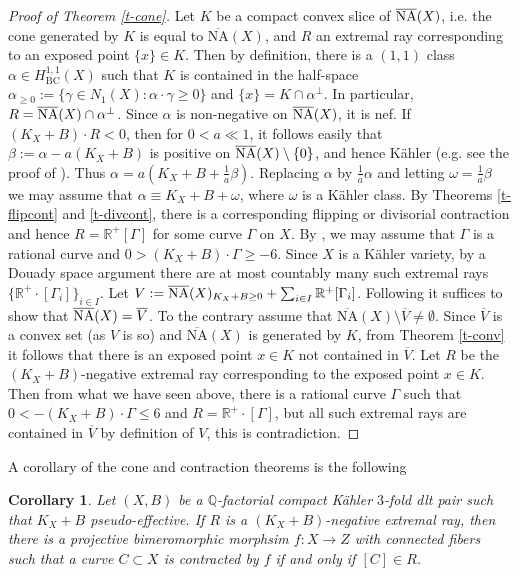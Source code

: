\documentclass[12pt]{amsart}
\theoremstyle{plain}
\newtheorem{corollary}[theorem]{Corollary}
\theoremstyle{remark}
\theoremstyle{definition}
\def\BC{\operatorname{BC}}
\def\NA{\overline{\operatorname{NA}}}
\newcommand{\<}{\leq}
\def\>{\geq}
\newcommand{\mbQ}{\mathbb{Q}}
\newcommand{\mbR}{\mathbb{R}}
\newcommand{\R}{{\mathbb{R}}}
\def\>{\geq}
\def\NA{\operatorname{\overline{NA}}}
\theoremstyle{definition}
\theoremstyle{definition}
\numberwithin{equation}{section}
\theoremstyle{remark}
\begin{document}
   \begin{proof}[Proof of Theorem \ref{t-cone}] Let $K$ be a compact convex slice of $\overline{\rm NA}(X)$, i.e. the cone generated by $K$ is equal to $\NA(X)$, and $R$ an extremal ray corresponding to an exposed point $\{x\}\in K$. Then by definition, there is a $(1,1)$ class $\alpha\in H^{1,1}_{\BC}(X)$ such that $K$ is contained in the half-space $\alpha_{\>0}:=\{\gamma\in N_1(X): \alpha\cdot\gamma\>0\}$ and $\{x\}=K\cap\alpha^\bot$. In particular, $R=\overline{\rm NA}(X)\cap \alpha ^\perp$. Since $\alpha$ is non-negative on $\overline{\rm NA}(X)$, it is nef. If $(K_X+B)\cdot R<0$, then for $0<a\ll 1$, it follows easily that $\beta :=\alpha -a(K_X+B)$ is positive on $\overline{\rm NA}(X)\setminus\{0\}$, and hence K\"ahler (e.g. see the proof of \cite[Claim 3.25]{DHY23}). Thus $\alpha =a(K_X+B+\frac 1 a \beta)$. Replacing $\alpha$ by $\frac 1 a\alpha$ and letting $\omega = \frac 1 a \beta$ we may assume that $\alpha \equiv K_X+B+\omega$, where $\omega$ is a K\"ahler class. By Theorems \ref{t-flipcont} and \ref{t-divcont}, there is a corresponding flipping or divisorial contraction and hence $R=\R ^+[\Gamma ]$ for some curve $\Gamma$ on $X$. By \cite[Theorem 4.2]{DO23}, we may assume that $\Gamma$ is a rational curve and $0>(K_X+B)\cdot \Gamma \geq -6$. Since $X$ is a K\"ahler variety, by a Douady space argument there are at most countably many such extremal rays $\{\mbR^+\cdot[\Gamma _i]\}_{i\in I}$.
 Let $V:=\overline{\rm NA}(X)_{K_X+B \geq 0}+\sum _{i\in I}\mathbb R ^+[\Gamma _i]$. Following \cite[Lemma 6.1]{HP16} it suffices to show that $\overline{\rm NA}(X) = \overline V$. To the contrary assume that $\NA(X)\setminus \overline V\neq\emptyset$. Since $\overline V$ is a convex set (as $V$ is so) and $\NA(X)$ is generated by $K$, from Theorem \ref{t-conv} it follows that there is an exposed point $x\in K$ not contained in $\overline V$. Let $R$ be the $(K_X+B)$-negative extremal ray corresponding to the exposed point $x\in K$. Then from what we have seen above, there is a rational curve $\Gamma$ such that $0<-(K_X+B)\cdot \Gamma\<6$ and $R=\mbR^+\cdot[\Gamma]$, but all such extremal rays are contained in $\overline V$ by definition of $V$, this is contradiction.
 
 \end{proof}

A corollary of the cone and contraction theorems is the following
\begin{corollary}\label{cor:dlt-contraction}
    Let $(X, B)$ be a $\mbQ$-factorial compact K\"ahler $3$-fold dlt pair such that $K_X+B$ pseudo-effective. If $R$ is a $(K_X+B)$-negative extremal ray, then there is a projective bimeromorphic morphsim $f:X\to Z$ with connected fibers such that a curve $C\subset X$ is contracted by $f$ if and only if $[C]\in R$. 
\end{corollary}
\end{document}
